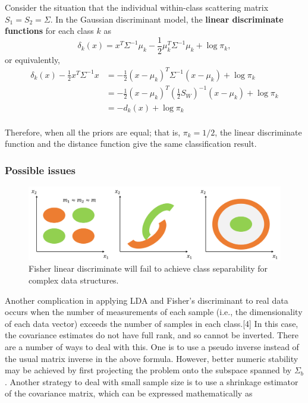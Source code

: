 \begin{refsection}
\begin{remark} Consider the situation that the individual within-class scattering matrix $S_1 = S_2 = \Sigma$.
In the Gaussian discriminant model, the \textbf{linear discriminate functions} for each class $k$ as
$$\delta_k(x) = x^T\Sigma^{-1}\mu_k - \frac{1}{2}\mu_k^T\Sigma^{-1}\mu_k + \log \pi_k,$$
or equivalently, 
\begin{align*}
\delta_k(x) - \frac{1}{2}x^T\Sigma^{-1}x  &= -\frac{1}{2}(x-\mu_k)^T\Sigma^{-1}(x-\mu_k) + \log \pi_k \\
&= -\frac{1}{2}(x-\mu_k)^T(\frac{1}{2}S_W)^{-1}(x-\mu_k) + \log \pi_k \\
&= -d_k(x) + \log \pi_k \\
\end{align*}

Therefore, when all the priors are equal; that is, $\pi_k = 1/2$, the linear discriminate function and the distance function give the same classification result.
\end{remark}




\subsubsection{Possible issues}



\begin{figure}[H]
	\centering
	\includegraphics[width=0.9\linewidth]{../figures/statisticalLearning/linearModelClassification/linearDiscriminateComplexStructureDemo}
	\caption{Fisher linear discriminate will fail to achieve class separability for complex data structures.}
	\label{fig:lineardiscriminatecomplexstructuredemo}
\end{figure}



\begin{remark}
Another complication in applying LDA and Fisher's discriminant to real data occurs when the number of measurements of each sample (i.e., the dimensionality of each data vector) exceeds the number of samples in each class.[4] In this case, the covariance estimates do not have full rank, and so cannot be inverted. There are a number of ways to deal with this. One is to use a pseudo inverse instead of the usual matrix inverse in the above formula. However, better numeric stability may be achieved by first projecting the problem onto the subspace spanned by $\Sigma_{b}$. Another strategy to deal with small sample size is to use a shrinkage estimator of the covariance matrix, which can be expressed mathematically as


\end{remark}
\end{refsection}
